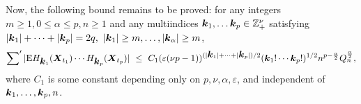 \documentclass[10pt]{article}
\def\Z{\mathbb{Z}}
\def\E{\mathrm E}
\newcommand{\mbf}[1]{\mbox{\boldmath $#1$}}
\begin{document}
Now, the following bound remains to be proved: for any integers
$m\ge 1, 0\le \alpha \le p, n \ge 1$ and any multiindices ${\mbf
k}_1, \dots {\mbf k}_p \in {\Z}^\nu_+ $ satisfying $ |{\mbf k}_1|+
\dots +|{\mbf k}_p| = 2q, \ |{\mbf k}_1| \ge m, \dots, |{\mbf
k}_\alpha| \ge m $,
\begin{equation}
\sum\nolimits^\prime |\E H_{{\mbf k}_1}({\mbf X}_{t_1}) \cdots
H_{{\mbf k}_p}({\mbf X}_{t_p})| \ \le \  C_1 (\varepsilon (\nu
p-1))^{(|{\mbf k}_1|+ \dots +|{\mbf k}_p|)/2} ({\mbf k}_1!\cdots {\mbf
k}_p!)^{1/2} n^{p-\frac{\alpha}{2}}Q_n^{\frac{\alpha}{2} },
\label{hermite_bdd}
\end{equation}
where $C_1 $ is some constant depending only on $p, \nu, \alpha,
\varepsilon$, and independent of ${\mbf k}_1, \dots, {\mbf k}_p, n$.

\smallskip
\end{document}
